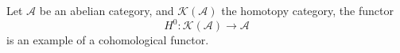 
 
 
Let $\mathcal A$ be an abelian category, and $\mathcal K(\mathcal A)$ the homotopy category, the functor 
\[H^0: \mathcal K(\mathcal A)\to \mathcal A\]
is an example of a cohomological functor.

 